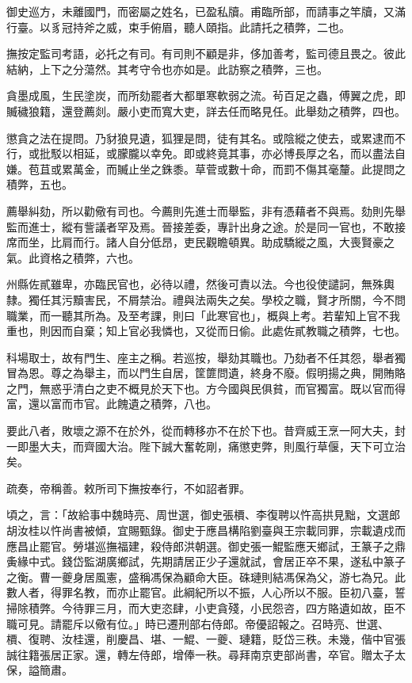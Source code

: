 \begin{pinyinscope}
御史巡方，未離國門，而密屬之姓名，已盈私牘。甫臨所部，而請事之竿牘，又滿行臺。以豸冠持斧之威，束手俯眉，聽人頤指。此請托之積弊，二也。

撫按定監司考語，必托之有司。有司則不顧是非，侈加善考，監司德且畏之。彼此結納，上下之分蕩然。其考守令也亦如是。此訪察之積弊，三也。

貪墨成風，生民塗炭，而所劾罷者大都單寒軟弱之流。茍百足之蟲，傅翼之虎，即贓穢狼籍，還登薦剡。嚴小吏而寬大吏，詳去任而略見任。此舉劾之積弊，四也。

懲貪之法在提問。乃豺狼見遺，狐狸是問，徒有其名。或陰縱之使去，或累逮而不行，或批駁以相延，或朦朧以幸免。即或終竟其事，亦必博長厚之名，而以盡法自嫌。苞苴或累萬金，而贓止坐之銖黍。草菅或數十命，而罰不傷其毫釐。此提問之積弊，五也。

薦舉糾劾，所以勸儆有司也。今薦則先進士而舉監，非有憑藉者不與焉。劾則先舉監而進士，縱有訾議者罕及焉。晉接差委，專計出身之途。於是同一官也，不敢接席而坐，比肩而行。諸人自分低昂，吏民觀瞻頓異。助成驕縱之風，大喪賢豪之氣。此資格之積弊，六也。

州縣佐貳雖卑，亦臨民官也，必待以禮，然後可責以法。今也役使譴訶，無殊輿隸。獨任其污黷害民，不屑禁治。禮與法兩失之矣。學校之職，賢才所關，今不問職業，而一聽其所為。及至考課，則曰「此寒官也」，概與上考。若輩知上官不我重也，則因而自棄；知上官必我憐也，又從而日偷。此處佐貳教職之積弊，七也。

科場取士，故有門生、座主之稱。若巡按，舉劾其職也。乃劾者不任其怨，舉者獨冒為恩。尊之為舉主，而以門生自居，筐篚問遺，終身不廢。假明揚之典，開賄賂之門，無惑乎清白之吏不概見於天下也。方今國與民俱貧，而官獨富。既以官而得富，還以富而市官。此餽遺之積弊，八也。

要此八者，敗壞之源不在於外，從而轉移亦不在於下也。昔齊威王烹一阿大夫，封一即墨大夫，而齊國大治。陛下誠大奮乾剛，痛懲吏弊，則風行草偃，天下可立治矣。

疏奏，帝稱善。敕所司下撫按奉行，不如詔者罪。

頃之，言：「故給事中魏時亮、周世選，御史張檟、李復聘以忤高拱見黜，文選郎胡汝桂以忤尚書被傾，宜賜甄錄。御史于應昌構陷劉臺與王宗載同罪，宗載遺戍而應昌止罷官。勞堪巡撫福建，殺侍郎洪朝選。御史張一鯤監應天鄉試，王篆子之鼎夤緣中式。錢岱監湖廣鄉試，先期請居正少子還就試，會居正卒不果，遂私中篆子之衡。曹一夔身居風憲，盛稱馮保為顧命大臣。硃璉則結馮保為父，游七為兄。此數人者，得罪名教，而亦止罷官。此綱紀所以不振，人心所以不服。臣初八臺，誓掃除積弊。今待罪三月，而大吏恣肆，小吏貪殘，小民怨咨，四方賂遺如故，臣不職可見。請罷斥以儆有位。」時已遷刑部右侍郎。帝優詔報之。召時亮、世選、檟、復聘、汝桂還，削慶昌、堪、一鯤、一夔、璉籍，貶岱三秩。未幾，偕中官張誠往籍張居正家。還，轉左侍郎，增俸一秩。尋拜南京吏部尚書，卒官。贈太子太保，謚簡肅。


\end{pinyinscope}
